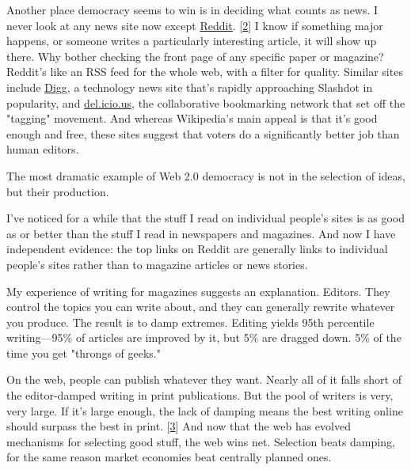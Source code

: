 Another
                    place democracy seems to win is in deciding what counts as
                    news. I never look at any news site now except
                    \href{http://reddit.com}{Reddit}.
                    [\href{\#f2n}{2}]
                    I know if something major happens, or someone writes a
                    particularly interesting article, it will show up there. Why
                    bother checking the front page of any specific paper or
                    magazine? Reddit's like an RSS feed for the whole web, with
                    a filter for quality. Similar sites include
                    \href{http://digg.com}{Digg}, a technology news site
                    that's rapidly approaching Slashdot in popularity, and
                    \href{http://del.icio.us}{del.icio.us}, the
                    collaborative bookmarking network that set off the "tagging"
                    movement. And whereas Wikipedia's main appeal is that it's
                    good enough and free, these sites suggest that voters do a
                    significantly better job than human editors.

The
                    most dramatic example of Web 2.0 democracy is not in the
                    selection of ideas, but their production.
                    
                    I've noticed for a while that the stuff I read on individual
                    people's sites is as good as or better than the stuff I read
                    in newspapers and magazines. And now I have independent
                    evidence: the top links on Reddit are generally links to
                    individual people's sites rather than to magazine articles
                    or news stories.

My experience of writing for
                    magazines suggests an explanation. Editors. They control the
                    topics you can write about, and they can generally rewrite
                    whatever you produce. The result is to damp extremes.
                    Editing yields 95th percentile writing---95\% of articles
                    are improved by it, but 5\% are dragged down. 5\% of the time
                    you get "throngs of geeks."

On the web, people
                    can publish whatever they want. Nearly all of it falls short
                    of the editor-damped writing in print publications. But the
                    pool of writers is very, very large. If it's large enough,
                    the lack of damping means the best writing online should
                    surpass the best in print.
                    [\href{\#f3n}{3}]
                    And now that the web has evolved mechanisms for selecting
                    good stuff, the web wins net. Selection beats damping, for
                    the same reason market economies beat centrally planned
                    ones.

